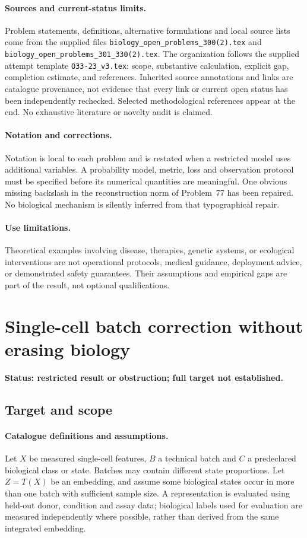 \documentclass[11pt]{article}
\begin{document}
\paragraph{Sources and current-status limits.}
Problem statements, definitions, alternative formulations and local source lists
come from the supplied files
\texttt{biology\_open\_problems\_300(2).tex} and
\texttt{biology\_open\_problems\_301\_330(2).tex}.
The organization follows the supplied attempt template
\texttt{O33-23\_v3.tex}: scope, substantive calculation, explicit gap,
completion estimate, and references. Inherited source annotations and links are
catalogue provenance, not evidence that every link or current open status has
been independently rechecked. Selected methodological references appear at the
end. No exhaustive literature or novelty audit is claimed.

\paragraph{Notation and corrections.}
Notation is local to each problem and is restated when a restricted model uses
additional variables. A probability model, metric, loss and observation protocol
must be specified before its numerical quantities are meaningful. One obvious
missing backslash in the reconstruction norm of Problem~77 has been repaired.
No biological mechanism is silently inferred from that typographical repair.

\paragraph{Use limitations.}
Theoretical examples involving disease, therapies, genetic systems, or ecological
interventions are not operational protocols, medical guidance, deployment advice,
or demonstrated safety guarantees. Their assumptions and empirical gaps are part
of the result, not optional qualifications.


\section*{Single-cell batch correction without erasing biology}
\label{prob:070}
\noindent\textbf{Status: restricted result or obstruction; full target not established.}
\subsection{Target and scope}
\paragraph{Catalogue definitions and assumptions.}
Let $X$ be measured single-cell features, $B$ a technical batch and $C$ a predeclared biological class or state. Batches may contain different state proportions. Let $Z=T(X)$ be an embedding, and assume some biological states occur in more than one batch with sufficient sample size. A representation is evaluated using held-out donor, condition and assay data; biological labels used for evaluation are measured independently where possible, rather than derived from the same integrated embedding.
\end{document}
